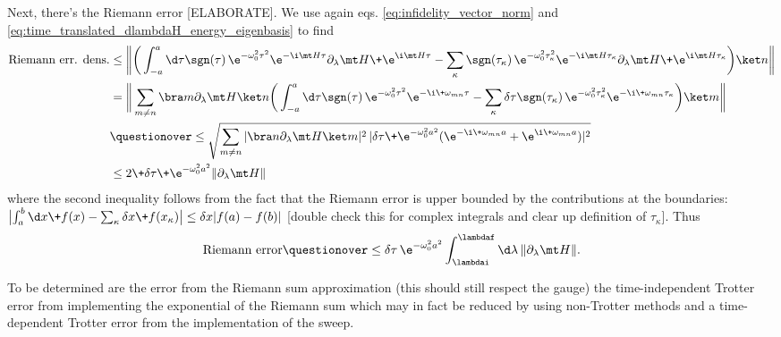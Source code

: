 Next, there's the Riemann error {\color{red} [ELABORATE]}. We use again eqs. \ref{eq:infidelity_vector_norm} and \ref{eq:time_translated_dlambdaH_energy_eigenbasis} to find
\begin{align}
    \text{Riemann err. dens.} &\leq \bigg\| \bigg( \int_{-a}^a \d\tau \sgn(\tau) \, \e^{-\omega_0^2\tau^2} \e^{-\i\mt H\tau} \partial_\lambda \mt H \+ \e^{\i\mt H\tau} - \sum_\kappa \sgn(\tau_\kappa) \, \e^{-\omega_0^2\tau_\kappa^2} \e^{-\i\mt H\tau_\kappa} \partial_\lambda \mt H \+ \e^{\i\mt H\tau_\kappa} \bigg) \ket n \bigg\| \nonumber \\
    &= \bigg\| \sum_{m\neq n} \bra m \partial_\lambda \mt H \ket n \bigg( \int_{-a}^a \d\tau \sgn(\tau) \, \e^{-\omega_0^2\tau^2} \e^{-\i \+ \omega_{mn}\tau} - \sum_\kappa \delta\tau \sgn(\tau_\kappa) \, \e^{-\omega_0^2\tau_\kappa^2} \e^{-\i \+ \omega_{mn}\tau_\kappa} \bigg) \ket m \bigg\| \nonumber \\
    &\questionover\leq \sqrt{ \sum_{m\neq n} |\bra n \partial_\lambda\mt H \ket m|^2 \, |\delta\tau \+ \e^{-\omega_0^2 a^2}(\e^{-\i \+ \omega_{mn}a} + \e^{\i \+ \omega_{mn}a})|^2 } \nonumber \\
    &\leq 2 \+ \delta\tau \+ \e^{-\omega_0^2 a^2} \|\partial_\lambda\mt H\|
\end{align}
where the second inequality follows from the fact that the Riemann error is upper bounded by the contributions at the boundaries: $\big| \! \int_a^b \d x \+ f(x) - \sum_\kappa \delta x \+ f(x_\kappa) \big| \leq \delta x |f(a) - f(b)|$ {\color{red} [double check this for complex integrals and clear up definition of $\tau_\kappa$]}. Thus
\begin{align}
    \text{Riemann error} \questionover\leq \delta\tau \, \e^{-\omega_0^2 a^2} \int_{\lambdai}^{\lambdaf} \d\lambda \, \|\partial_\lambda\mt H\|.
\end{align}

To be determined are the error from the Riemann sum approximation (this should still respect the gauge) the time-independent Trotter error from implementing the exponential of the Riemann sum {\color{red} which may in fact be reduced by using non-Trotter methods} and a time-dependent Trotter error from the implementation of the sweep. 

